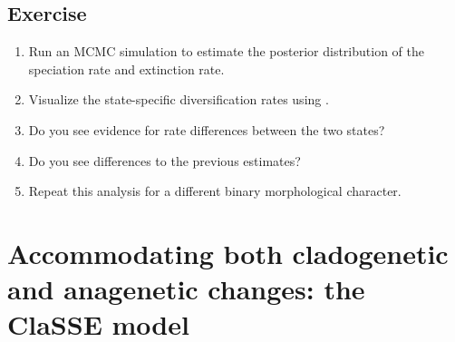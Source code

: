 


\subsection{Exercise}

\begin{enumerate}
\item Run an MCMC simulation to estimate the posterior distribution of the speciation rate and extinction rate.
\item Visualize the state-specific diversification rates using \R.
\item Do you see evidence for rate differences between the two states?
\item Do you see differences to the previous \BiSSE estimates?
\item Repeat this analysis for a different binary morphological character.
\end{enumerate}



\bigskip
\section{Accommodating both cladogenetic and anagenetic changes: the ClaSSE model}\label{sec:ClaSSE}


\bigskip



